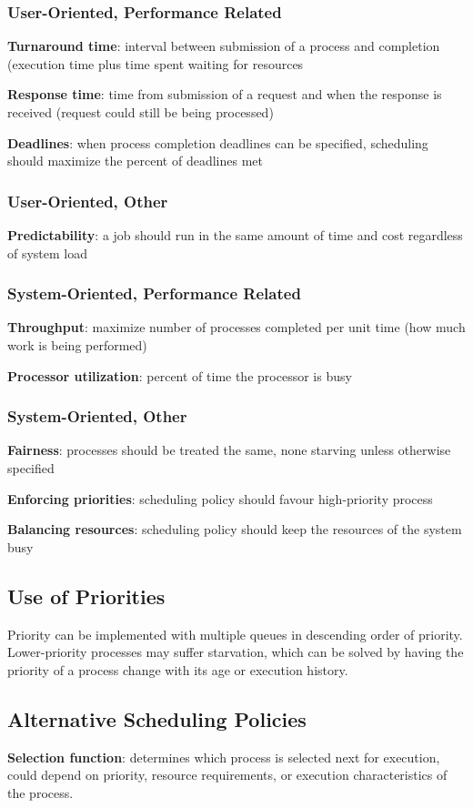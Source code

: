 \documentclass[11pt]{article}
\begin{document}
\subsubsection{User-Oriented, Performance Related}
\label{sec:orgbf1f197}
\textbf{Turnaround time}: interval between submission of a process and completion (execution
time plus time spent waiting for resources

\textbf{Response time}: time from submission of a request and when the response is received
(request could still be being processed)

\textbf{Deadlines}: when process completion deadlines can be specified, scheduling should
maximize the percent of deadlines met
\subsubsection{User-Oriented, Other}
\label{sec:org8f16e0b}
\textbf{Predictability}: a job should run in the same amount of time and cost regardless of
system load
\subsubsection{System-Oriented, Performance Related}
\label{sec:org59cb16f}
\textbf{Throughput}: maximize number of processes completed per unit time (how much work is being
performed)

\textbf{Processor utilization}: percent of time the processor is busy
\subsubsection{System-Oriented, Other}
\label{sec:orgce117b3}
\textbf{Fairness}: processes should be treated the same, none starving unless otherwise specified

\textbf{Enforcing priorities}: scheduling policy should favour high-priority process

\textbf{Balancing resources}: scheduling policy should keep the resources of the system busy
\subsection{Use of Priorities}
\label{sec:org7498890}
Priority can be implemented with multiple queues in descending order of priority.
Lower-priority processes may suffer starvation, which can be solved by having the priority
of a process change with its age or execution history.
\subsection{Alternative Scheduling Policies}
\label{sec:org67ccf2e}
\textbf{Selection function}: determines which process is selected next for execution, could depend
on priority, resource requirements, or execution characteristics of the process.
\end{document}
